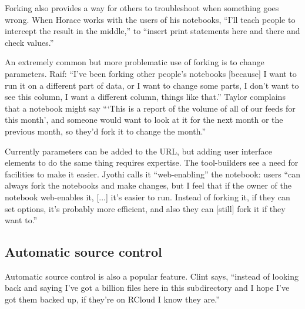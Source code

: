Forking also provides a way for others to troubleshoot when something goes
wrong.  When Horace works with the users of his notebooks, ``I'll teach people
to intercept the result in the middle,'' to ``insert print statements here and
there and check values.''



An extremely common but more problematic use of forking is to change
parameters. Raif: ``I've been forking other people's notebooks [because] I
want to run it on a different part of data, or I want to change some parts,
I don't want to see this column, I want a different column, things like
that.''  Taylor complains that a notebook might say ```This is a report of
the volume of all of our feeds for this month', and someone would want to
look at it for the next month or the previous month, so they'd fork it to
change the month.''

Currently parameters can be added to the URL, but adding user interface
elements to do the same thing requires expertise. The tool-builders see a
need for facilities to make it easier. Jyothi calls it ``web-enabling'' the
notebook: users ``can always fork the notebooks and make changes, but I
feel that if the owner of the notebook web-enables it, [...] it's easier to
run. Instead of forking it, if they can set options, it's probably more
efficient, and also they can [still] fork it if they want to.''


\subsection{Automatic source control}

Automatic source control is also a popular feature. Clint says, ``instead of
looking back and saying I've got a billion files here in this subdirectory and I
hope I've got them backed up, if they're on RCloud I know they are.''

